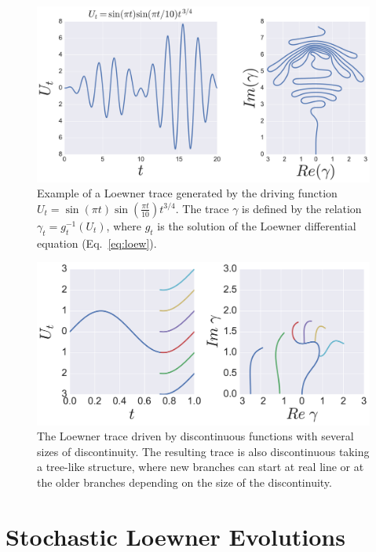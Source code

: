 \begin{figure}
\begin{center}
    \includegraphics[width=\textwidth]{chapters/ch4-sle/figs/leexample}
\end{center}
\caption{Example of a Loewner trace generated by the driving function
    $U_t=\sin(\pi t)\sin(\frac{\pi t}{10})t^{3/4}$. The trace $\gamma$ is
    defined by the relation $\gamma_t = g_t^{-1}(U_t)$, where $g_t$ is the
    solution of the Loewner differential equation (Eq.~\ref{eq:loew}).}
\label{fig:leexample}
\end{figure}

\begin{figure}
\begin{center}
    \includegraphics[width=\textwidth]{chapters/ch4-sle/figs/discle}
\end{center}
\caption{The Loewner trace driven by discontinuous functions with several sizes
    of discontinuity. The resulting trace is also discontinuous taking a
    tree-like structure, where new branches can start at real line or at the
    older branches depending on the size of the discontinuity.}
\label{fig:discle}
\end{figure}


\section{Stochastic Loewner Evolutions}
\label{sec:le}


